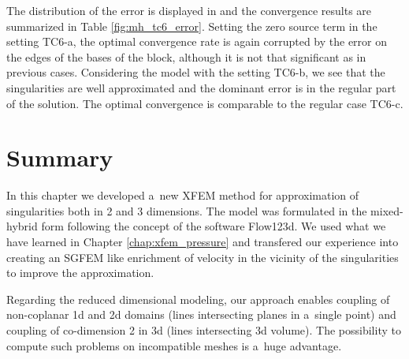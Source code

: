 The distribution of the error is displayed in 
and the convergence results are summarized in Table \ref{fig:mh_tc6_error}.
Setting the zero source term in the setting TC6-a, the optimal convergence rate is again corrupted by the error on the edges of the bases of the block,
although it is not that significant as in previous cases.
Considering the model with the setting TC6-b, we see that the singularities are well approximated
and the dominant error is in the regular part of the solution. The optimal convergence is comparable to the regular case TC6-c.

\section{Summary}
In this chapter we developed a~new XFEM method for approximation of singularities both in 2 and 3 dimensions.
The model was formulated in the mixed-hybrid form following the concept of the software Flow123d.
We used what we have learned in Chapter \ref{chap:xfem_pressure} and transfered our experience into creating
an SGFEM like enrichment of velocity in the vicinity of the singularities to improve the approximation.

Regarding the reduced dimensional modeling, our approach enables coupling of non-coplanar 1d and 2d domains
(lines intersecting planes in a~single point) and coupling of co-dimension 2 in 3d (lines intersecting 3d volume).
The possibility to compute such problems on incompatible meshes is a~huge advantage.

